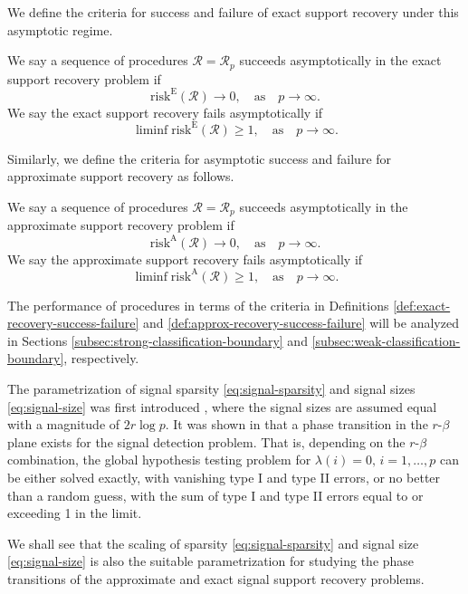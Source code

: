 We define the criteria for success and failure of exact support recovery under this asymptotic regime.
\begin{definition} \label{def:exact-recovery-success-failure}
We say a sequence of procedures $\mathcal{R} = \mathcal{R}_p$ succeeds asymptotically in the exact support recovery problem if 
\begin{equation} \label{eq:exact-recovery-success}
    \mathrm{risk}^{\mathrm{E}}(\mathcal{R}) \to 0, \quad \text{as}\quad p\to\infty.
\end{equation}
We say the exact support recovery fails asymptotically if 
\begin{equation} \label{eq:exact-recovery-failure}
    \liminf\mathrm{risk}^{\mathrm{E}}(\mathcal{R}) \ge 1, \quad \text{as}\quad p\to\infty.
\end{equation}
\end{definition}
Similarly, we define the criteria for asymptotic success and failure for approximate support recovery as follows.
\begin{definition} \label{def:approx-recovery-success-failure}
We say a sequence of procedures $\mathcal{R} = \mathcal{R}_p$ succeeds asymptotically in the approximate support recovery problem if 
\begin{equation} \label{eq:approx-recovery-success}
    \mathrm{risk}^{\mathrm{A}}(\mathcal{R}) \to 0, \quad \text{as}\quad p\to\infty.
\end{equation}
We say the approximate support recovery fails asymptotically if 
\begin{equation} \label{eq:approx-recovery-failure}
    \liminf\mathrm{risk}^{\mathrm{A}}(\mathcal{R}) \ge 1, \quad \text{as}\quad p\to\infty.
\end{equation}
\end{definition}
The performance of procedures in terms of the criteria in Definitions \ref{def:exact-recovery-success-failure} and \ref{def:approx-recovery-success-failure} will be analyzed in Sections \ref{subsec:strong-classification-boundary} and \ref{subsec:weak-classification-boundary}, respectively.

\begin{remark}
The parametrization of signal sparsity \eqref{eq:signal-sparsity} and signal sizes  \eqref{eq:signal-size} was first introduced \citet{donoho2004higher}, where the signal sizes are assumed equal with a magnitude of $2{r}\log{p}$.
It was shown in \cite{donoho2004higher} that a phase transition in the $r$-$\beta$ plane exists for the signal detection problem. 
That is, depending on the $r$-$\beta$ combination, the global hypothesis testing problem for $\lambda(i)=0,\,i=1,\ldots,p$ can be either solved exactly, with vanishing type I and type II errors, or no better than a random guess, with the sum of type I and type II errors equal to or exceeding 1 in the limit.

We shall see that the scaling of sparsity \eqref{eq:signal-sparsity} and signal size \eqref{eq:signal-size} is also the suitable parametrization for studying the phase transitions of the approximate and exact signal support recovery problems.
\end{remark}

